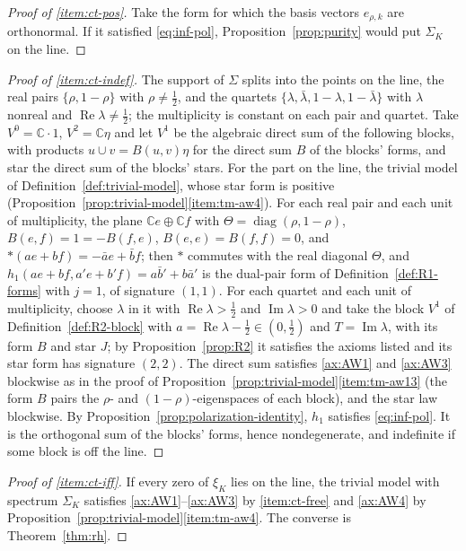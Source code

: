 \documentclass[11pt]{amsart}
\theoremstyle{plain}
\theoremstyle{definition}
\theoremstyle{remark}
\numberwithin{equation}{section}
\newcommand{\C}{\mathbb{C}}
\DeclareMathOperator{\Ima}{Im}
\DeclareMathOperator{\Rea}{Re}
\DeclareMathOperator{\diag}{diag}
\renewcommand{\Re}{\Rea}
\renewcommand{\Im}{\Ima}
\begin{document}
\begin{proof}[Proof of \ref{item:ct-pos}]
Take the form for which the basis vectors $e_{\rho,k}$ are orthonormal.
If it satisfied \eqref{eq:inf-pol}, Proposition~\ref{prop:purity}
would put $\Sigma_K$ on the line.
\end{proof}

\begin{proof}[Proof of \ref{item:ct-indef}]
The support of $\Sigma$ splits into the points on the line, the real
pairs $\{\rho,1-\rho\}$ with $\rho\ne\tfrac12$, and the quartets
$\{\lambda,\bar\lambda,1-\lambda,1-\bar\lambda\}$ with $\lambda$
nonreal and $\Re\lambda\ne\tfrac12$; the multiplicity is constant on
each pair and quartet. Take $V^0=\C\cdot1$, $V^2=\C\eta$ and let $V^1$
be the algebraic direct sum of the following blocks, with products
$u\cup v=B(u,v)\eta$ for the direct sum $B$ of the blocks' forms, and
star the direct sum of the blocks' stars. For the part on the line, the
trivial model of Definition~\ref{def:trivial-model}, whose star form is
positive (Proposition~\ref{prop:trivial-model}\ref{item:tm-aw4}). For
each real pair and each unit of multiplicity, the plane $\C e\oplus\C f$
with $\Theta=\diag(\rho,1-\rho)$, $B(e,f)=1=-B(f,e)$, $B(e,e)=
B(f,f)=0$, and $*(ae+bf)=-\bar ae+\bar bf$; then $*$ commutes with the
real diagonal $\Theta$, and $h_1(ae+bf,a'e+b'f)=a\bar b'+b\bar a'$ is
the dual-pair form of Definition~\ref{def:R1-forms} with $j=1$, of
signature $(1,1)$. For each quartet and each unit of multiplicity,
choose $\lambda$ in it with $\Re\lambda>\tfrac12$ and $\Im\lambda>0$
and take the block $V^1$ of Definition~\ref{def:R2-block} with
$a=\Re\lambda-\tfrac12\in(0,\tfrac12)$ and $T=\Im\lambda$, with its
form $B$ and star $J$; by Proposition~\ref{prop:R2} it satisfies the
axioms listed and its star form has signature $(2,2)$. The direct sum
satisfies \ref{ax:AW1} and \ref{ax:AW3} blockwise as in the proof of
Proposition~\ref{prop:trivial-model}\ref{item:tm-aw13} (the form $B$
pairs the $\rho$- and $(1-\rho)$-eigenspaces of each block), and the
star law blockwise. By Proposition~\ref{prop:polarization-identity},
$h_1$ satisfies \eqref{eq:inf-pol}. It is the orthogonal sum of the
blocks' forms, hence nondegenerate, and indefinite if some block is off
the line.
\end{proof}

\begin{proof}[Proof of \ref{item:ct-iff}]
If every zero of $\xi_K$ lies on the line, the trivial model with
spectrum $\Sigma_K$ satisfies \ref{ax:AW1}--\ref{ax:AW3} by
\ref{item:ct-free} and \ref{ax:AW4} by
Proposition~\ref{prop:trivial-model}\ref{item:tm-aw4}. The converse is
Theorem~\ref{thm:rh}.
\end{proof}
\end{document}
